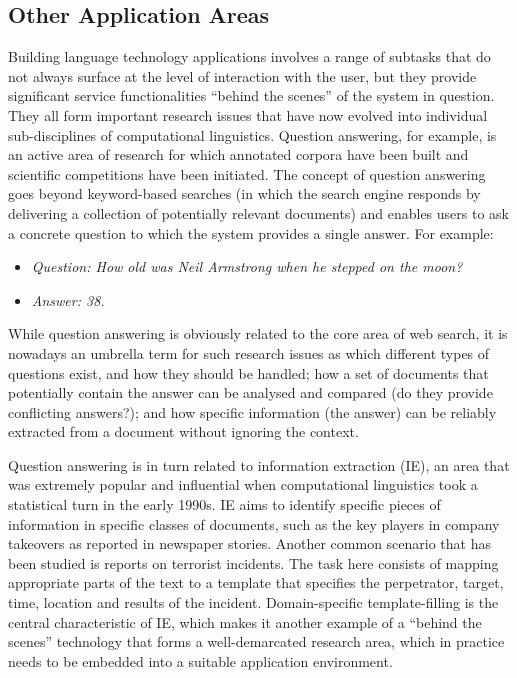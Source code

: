 \begin{multicols}{2}
\subsection{Other Application Areas}

Building language technology applications involves a range of subtasks that do not always surface at the level of interaction with the user, but they provide significant service functionalities ``behind the scenes'' of the system in question. They all form important research issues that have now evolved into individual sub-disciplines of computational linguistics.  Question answering, for example, is an active area of research for which annotated corpora have been built and scientific competitions have been initiated. The concept of question answering goes beyond keyword-based searches (in which the search engine responds by delivering a collection of potentially relevant documents) and enables users to ask a concrete question to which the system provides a single answer. For example:

\begin{itemize}
\item[] \textit{Question: How old was Neil Armstrong when he stepped on the moon?}
\item[] \textit{Answer: 38.}
\end{itemize}

While question answering is obviously related to the core area of web search, it is nowadays an umbrella term for such research issues as which different types of questions exist, and how they should be handled; how a set of documents that potentially contain the answer can be analysed and compared (do they provide conflicting answers?); and how specific information (the answer) can be reliably extracted from a document without ignoring the context.


Question answering is in turn related to information extraction (IE), an area that was extremely popular and influential when computational linguistics took a statistical turn in the early 1990s. IE aims to identify specific pieces of information in specific classes of documents, such as the key players in company takeovers as reported in newspaper stories. Another common scenario that has been studied is reports on terrorist incidents. The task here consists of mapping appropriate parts of the text to a template that specifies the perpetrator, target, time, location and results of the incident. Domain-specific template-filling is the central characteristic of IE, which makes it another example of a ``behind the scenes'' technology that forms a well-demarcated research area, which in practice needs to be embedded into a suitable application environment.


\end{multicols}
